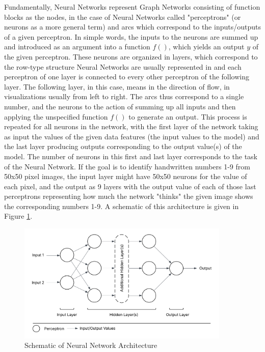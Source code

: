 Fundamentally, Neural Networks represent Graph Networks consisting of function blocks as the nodes, in the case of Neural Networks called "perceptrons" (or neurons as a more general term) and arcs which correspond to the inputs/outputs of a given perceptron. In simple words, the inputs to the neurons are summed up and introduced as an argument into a function $f()$, which yields an output $y$ of the given perceptron. These neurons are organized in layers, which correspond to the row-type structure Neural Networks are usually represented in and each perceptron of one layer is connected to every other perceptron of the following layer. The following layer, in this case, means in the direction of flow, in visualizations usually from left to right. The arcs thus correspond to a single number, and the neurons to the action of summing up all inputs and then applying the unspecified function $f()$ to generate an output. This process is repeated for all neurons in the network, with the first layer of the network taking as input the values of the given data features (the input values to the model) and the last layer producing outputs corresponding to the output value(s) of the model. The number of neurons in this first and last layer corresponds to the task of the Neural Network. If the goal is to identify handwritten numbers 1-9 from 50x50 pixel images, the input layer might have 50x50 neurons for the value of each pixel, and the output as 9 layers with the output value of each of those last perceptrons representing how much the network "thinks" the given image shows the corresponding numbers 1-9. A schematic of this architecture is given in Figure \ref{fig:neural_network_architecture}.

\begin{figure}[h] 
\centering
\includegraphics[width=0.9\textwidth]{../figures/modelling/neural_network_concept.png} %
\caption{Schematic of Neural Network Architecture}
\label{fig:neural_network_architecture}
\end{figure}

